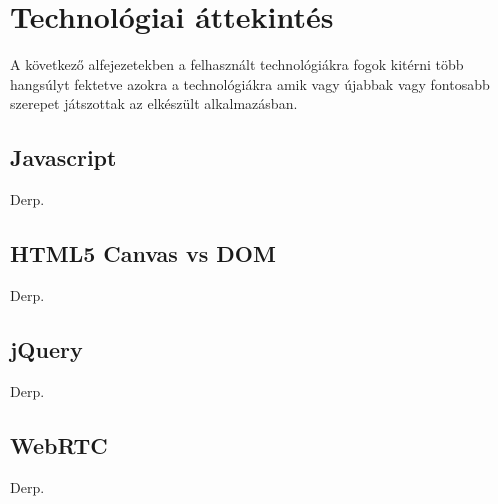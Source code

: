 



\chapter{Technológiai áttekintés}
A következő alfejezetekben a felhasznált technológiákra fogok kitérni több hangsúlyt fektetve azokra a technológiákra amik vagy újabbak vagy fontosabb szerepet játszottak az elkészült alkalmazásban.


\section{Javascript}
Derp.

\section{HTML5 Canvas vs DOM}
Derp.



\section{jQuery}
Derp.








\section{WebRTC}
Derp.

